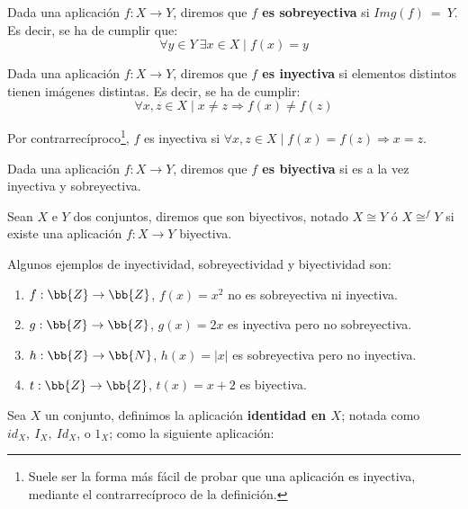 \begin{definicion}[Sobreyectividad]
    Dada una aplicación $f:X \rightarrow Y$, diremos que \textbf{$f$ es sobreyectiva} si $Img(f)~=~Y$. Es decir, se ha de cumplir que:
    $$\forall y \in Y ~\exists x \in X \mid f(x) = y$$
\end{definicion}

\begin{definicion}[Inyectividad]
    Dada una aplicación $f:X \rightarrow Y$, diremos que \textbf{$f$ es inyectiva} si elementos distintos tienen imágenes distintas. Es decir, se ha de cumplir:
    $$\forall x,z \in X \mid x \neq z \Longrightarrow f(x) \neq f(z)$$
    
    Por contrarrecíproco\footnote{Suele ser la forma más fácil de probar que una aplicación es inyectiva, mediante el contrarrecíproco de la definición.}, $f$ es inyectiva si $\forall x,z \in X \mid f(x) = f(z) \Longrightarrow x = z$.
\end{definicion}

\begin{definicion}[Biyectividad]
    Dada una aplicación $f:X \rightarrow Y$, diremos que \textbf{$f$ es biyectiva} si es a la vez inyectiva y sobreyectiva.
\end{definicion}

\begin{definicion}
    Sean $X$ e $Y$ dos conjuntos, diremos que son biyectivos, notado $X \cong Y$ ó $\displaystyle X \mathop{\cong}^{f} Y$
    si existe una aplicación $f:X \rightarrow Y$ biyectiva.
\end{definicion}

\begin{ejemplo}
    Algunos ejemplos de inyectividad, sobreyectividad y biyectividad son:
    \begin{enumerate}
        \item $f:\bb{Z}\to\bb{Z}$, $f(x)=x^2$ no es sobreyectiva ni inyectiva.
        \item $g:\bb{Z}\to\bb{Z}$, $g(x)=2x$ es inyectiva pero no sobreyectiva.
        \item $h:\bb{Z}\to\bb{N}$, $h(x)=|x|$ es sobreyectiva pero no inyectiva.
        \item $t:\bb{Z}\to\bb{Z}$, $t(x)=x+2$ es biyectiva.
    \end{enumerate}
\end{ejemplo}

\begin{definicion}
    Sea $X$ un conjunto, definimos la aplicación \textbf{identidad en $X$}; notada como $id_X,~I_X,~Id_X$, o $1_X$; como la
    siguiente aplicación:
\end{definicion}

